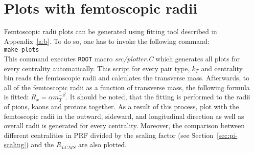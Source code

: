   \section{Plots with femtoscopic radii}
    Femtoscopic radii plots can be generated using fitting tool described in Appendix~\ref{a:b}.
    To do so, one has to invoke the following command:\\
    \verb|make plots|\\
    This command executes \verb|ROOT| macro \textit{src/plotter.C} which generates all plots for every centrality automatically.
    This script for every pair type, $k_T$ and centrality bin reads the femtoscopic radii and calculates the transverse mass.
    Afterwards, to all of the femtoscopic radii as a function of transverse mass, the following formula is fitted: $R_x=\alpha m_T^{-\beta}$.
    It should be noted, that the fitting is performed to the radii of pions, kaons and protons together.
    As a result of this process, plot with the femtoscopic radii in the outward, sideward, and longitudinal direction as well as overall radii is generated for every centrality.
    Moreover, the comparison between different centralities in PRF divided by the scaling factor (see Section~\ref{sec:pi-scaling}) and the $R_{LCMS}$ are also plotted.

